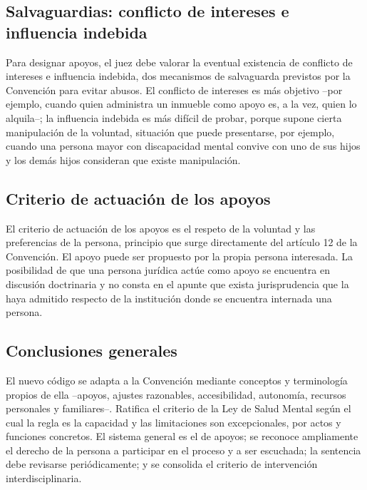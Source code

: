 \documentclass[12pt,oneside]{book}
\begin{document}
\subsection{Salvaguardias: conflicto de intereses e influencia indebida}

Para designar apoyos, el juez debe valorar la eventual existencia de conflicto de intereses e influencia indebida, dos mecanismos de salvaguarda previstos por la Convención para evitar abusos. El conflicto de intereses es más objetivo --por ejemplo, cuando quien administra un inmueble como apoyo es, a la vez, quien lo alquila--; la influencia indebida es más difícil de probar, porque supone cierta manipulación de la voluntad, situación que puede presentarse, por ejemplo, cuando una persona mayor con discapacidad mental convive con uno de sus hijos y los demás hijos consideran que existe manipulación.

\subsection{Criterio de actuación de los apoyos}

El criterio de actuación de los apoyos es el respeto de la voluntad y las preferencias de la persona, principio que surge directamente del artículo 12 de la Convención. El apoyo puede ser propuesto por la propia persona interesada. La posibilidad de que una persona jurídica actúe como apoyo se encuentra en discusión doctrinaria y no consta en el apunte que exista jurisprudencia que la haya admitido respecto de la institución donde se encuentra internada una persona.


\subsection{Conclusiones generales}

El nuevo código se adapta a la Convención mediante conceptos y terminología propios de ella --apoyos, ajustes razonables, accesibilidad, autonomía, recursos personales y familiares--. Ratifica el criterio de la Ley de Salud Mental según el cual la regla es la capacidad y las limitaciones son excepcionales, por actos y funciones concretos. El sistema general es el de apoyos; se reconoce ampliamente el derecho de la persona a participar en el proceso y a ser escuchada; la sentencia debe revisarse periódicamente; y se consolida el criterio de intervención interdisciplinaria.
\end{document}

